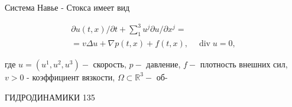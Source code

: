 \documentclass[10pt]{article}
\begin{document}
Система Навье - Стокса имеет вид



\[

\begin{gathered}

\partial u(t, x) / \partial t+\sum_{1}^{3} u^{j} \partial u / \partial x^{j}= \\

=v \Delta u+\nabla p(t, x)+f(t, x), \quad \operatorname{div} u=0,

\end{gathered}

\]



где $u=\left(u^{1}, u^{2}, u^{3}\right)-$ скорость, $p-$ давление, $f-$ плотность внешних сил, $v>0$ - коэффициент вязкости, $\Omega \subset \mathbb{R}^{3}-$ об-



ГИДРОДИНАМИКИ 135
\end{document}
